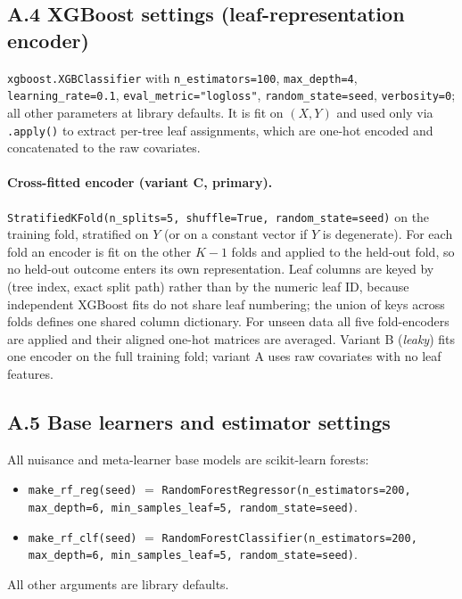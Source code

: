 \subsection*{A.4 XGBoost settings (leaf-representation encoder)}

\texttt{xgboost.XGBClassifier} with \texttt{n\_estimators=100},
\texttt{max\_depth=4}, \texttt{learning\_rate=0.1},
\texttt{eval\_metric="logloss"}, \texttt{random\_state=seed},
\texttt{verbosity=0}; all other parameters at library defaults. It is fit on
$(X, Y)$ and used only via \texttt{.apply()} to extract per-tree leaf
assignments, which are one-hot encoded and concatenated to the raw covariates.

\paragraph{Cross-fitted encoder (variant C, primary).}
\texttt{StratifiedKFold(n\_splits=5, shuffle=True, random\_state=seed)} on the
training fold, stratified on $Y$ (or on a constant vector if $Y$ is degenerate).
For each fold an encoder is fit on the other $K-1$ folds and applied to the
held-out fold, so no held-out outcome enters its own representation. Leaf
columns are keyed by (tree index, exact split path) rather than by the numeric
leaf ID, because independent XGBoost fits do not share leaf numbering; the union
of keys across folds defines one shared column dictionary. For unseen data all
five fold-encoders are applied and their aligned one-hot matrices are averaged.
Variant B (\emph{leaky}) fits one encoder on the full training
fold; variant A uses raw covariates with no leaf features.

\subsection*{A.5 Base learners and estimator settings}

All nuisance and meta-learner base models are scikit-learn forests:
\begin{itemize}\tightlist
\item \texttt{make\_rf\_reg(seed)} $=$ \texttt{RandomForestRegressor(n\_estimators=200, max\_depth=6, min\_samples\_leaf=5, random\_state=seed)}.
\item \texttt{make\_rf\_clf(seed)} $=$ \texttt{RandomForestClassifier(n\_estimators=200, max\_depth=6, min\_samples\_leaf=5, random\_state=seed)}.
\end{itemize}
All other arguments are library defaults.

